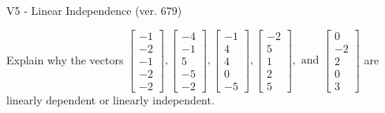 \begin{exercise}
  \begin{exerciseTitle}V5 - Linear Independence (ver. 679)\end{exerciseTitle}
  \begin{exerciseStatement}
    Explain why the vectors \(\left[\begin{array}{r}
-1 \\
-2 \\
-1 \\
-2 \\
-2
\end{array}\right] , \left[\begin{array}{r}
-4 \\
-1 \\
5 \\
-5 \\
-2
\end{array}\right] , \left[\begin{array}{r}
-1 \\
4 \\
4 \\
0 \\
-5
\end{array}\right] , \left[\begin{array}{r}
-2 \\
5 \\
1 \\
2 \\
5
\end{array}\right] , \text{ and } \left[\begin{array}{r}
0 \\
-2 \\
2 \\
0 \\
3
\end{array}\right]\) are linearly dependent or linearly independent.	



\end{exerciseStatement}
\end{exercise}
